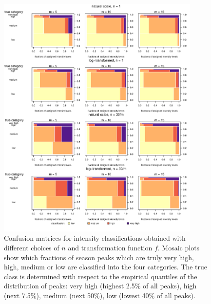 \documentclass{article}
\begin{document}
\begin{figure}
\includegraphics[width=0.9\textwidth]{figure/mosaic_fr.pdf}
\caption{Confusion matrices for intensity classifications obtained with different choices of $n$ and transformation function $f$. Mosaic plots show which fractions of season peaks which are truly very high, high, medium or low are classified into the four categories. The true class is determined with respect to the empirical quantiles of the distribution of peaks: very high (highest 2.5\% of all peaks), high (next 7.5\%), medium (next 50\%), low (lowest 40\% of all peaks).}
\label{fig:mosaic}
\end{figure}

\end{document}
